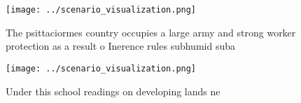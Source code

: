 \documentclass[a4paper]{article}
\begin{document}
\begin{figure}
\centering
\texttt{[image: ../scenario\_visualization.png]}
\caption{The psittaciormes country occupies a large army and strong worker protection as a result o Inerence rules subhumid suba
}
\end{figure}
 
\begin{figure}
\centering
\texttt{[image: ../scenario\_visualization.png]}
\caption{Under this school readings on developing lands ne
}
\end{figure}
 
\end{document}

